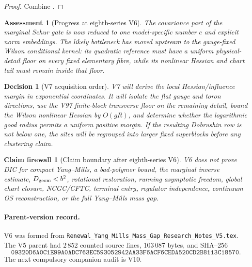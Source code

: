 \documentclass[11pt,oneside]{book}
\newtheorem{assessment}[theorem]{Assessment}
\newtheorem{firewall}[theorem]{Claim firewall}
\newtheorem{decision}[theorem]{Decision}
\theoremstyle{definition}
\theoremstyle{remark}
\begin{document}
\begin{proof}
Combine
.
\end{proof}

\begin{assessment}[Progress at eighth-series V6]
\label{ass:e8v6-status}
The covariance part of the marginal Schur gate is now reduced to one
model-specific number \(c\) and explicit norm embeddings.  The likely
bottleneck has moved upstream to the gauge-fixed Wilson conditional
kernel: its quadratic reference must have a uniform physical-detail
floor on every fixed elementary fibre, while its nonlinear Hessian
and chart tail must remain inside that floor.
\end{assessment}

\begin{decision}[V7 acquisition order]
\label{dec:e8v6-V7}
V7 will derive the local Hessian/influence margin in exponential
coordinates.  It will isolate the flat gauge and toron directions,
use the V97 finite-block transverse floor on the remaining detail,
bound the Wilson nonlinear Hessian by \(O(gR)\), and determine whether
the logarithmic good radius permits a uniform positive margin.  If
the resulting Dobrushin row is not below one, the sites will be
regrouped into larger fixed superblocks before any clustering claim.
\end{decision}

\begin{firewall}[Claim boundary after eighth-series V6]
\label{fire:e8v6-claim}
V6 does not prove DIC for compact Yang--Mills, a bad-polymer bound,
the marginal inverse estimate, \(D_{\rm geom}<b^2\), rotational
restoration, running asymptotic freedom, global chart closure,
NCGC/CFTC, terminal entry, regulator independence, continuum OS
reconstruction, or the full Yang--Mills mass gap.
\end{firewall}

\paragraph{Parent-version record.}
V6 was formed from
\texttt{Renewal\_Yang\_Mills\_Mass\_Gap\_Research\_Notes\_V5.tex}.
The V5 parent had \(2\,852\) counted source lines,
\(103\,087\) bytes, and SHA--256
\[
\texttt{09320D6A0C1E99A0ADC763EC593052942AA33F6ACF6CEDA520CD2B8113C18570}.
\]
The next compulsory companion audit is V10.
\end{document}
